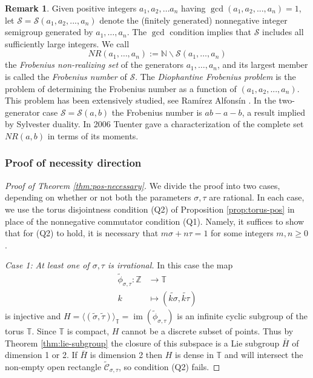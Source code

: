 \documentclass[11pt, letterpaper, reqno]{amsart}
\theoremstyle{definition}
\newtheorem{rmk}[thm]{Remark}
\numberwithin{equation}{section}
\newcommand{\ZZ}{\ensuremath{\mathbb{Z}}}
\newcommand{\NN}{\mathbb{N}}
\newcommand{\TT}{\mathbb{T}}
\newcommand{\cCbar}{\widetilde{\mathcal{C}}}
\newcommand{\sS}{{\mathcal{S}}}
\newcommand{\talpha}{{\sigma}}
\newcommand{\trho}{{\tau}}
\DeclareMathOperator{\im}{im} %
\begin{document}
{%
\begin{rmk}\label{rem:59}
Given positive integers $a_1, a_2, \ldots a_n$ having $\gcd(a_1, a_2, ..., a_n)=1$,
let $\sS= \sS(a_1, a_2, ..., a_n)$ denote the (finitely generated) nonnegative integer semigroup 
generated by  $a_1, \ldots, a_n$.
The $\gcd$ condition implies that $\sS$ includes all sufficiently large integers.
We  call  
$$NR(a_1,\ldots,a_n) :=  \NN \smallsetminus \sS(a_1,\ldots,a_n) $$ 
 the {\em Frobenius non-realizing set} of the  generators $a_1,\ldots,a_n$,
 and its largest member  is called the {\em Frobenius number} of $\sS$. 
 The {\em Diophantine Frobenius problem} is the
 problem of determining the Frobenius number as a function of $(a_1, a_2, ..., a_n)$.
This problem  has been extensively studied,  see Ram\'{i}rez Alfons\'{i}n \cite{RA05}.
In  the two-generator case $\sS= \sS(a, b)$ the Frobenius number is $ab-a-b$,
a result implied by  Sylvester duality. 
 In 2006 Tuenter \cite{Tue06} gave a characterization of the complete set $NR(a, b)$ in
 terms of  its moments.
\end{rmk}
%
\subsubsection{Proof of necessity direction}

\begin{proof}[Proof of Theorem \ref{thm:pos-necessary}]
We divide the proof into two cases, depending on whether or not both the parameters 
$\talpha, \trho$ are  rational.
In each case, 
we use the torus disjointness condition (Q2) of Proposition \ref{prop:torus-pos} 
in place of the nonnegative commutator condition (Q1).
Namely, it suffices to show that for (Q2) to hold,
it is necessary that
$m\talpha + n\trho = 1$ for some integers $m,n\geq 0$.

{\em Case 1:}
{\em At least one of $\talpha, \trho$ is irrational.}
In this case  the map
\begin{align*}
\widetilde{\phi}_{\talpha,\trho} : \ZZ &\to \TT \\
k &\mapsto (\widetilde{k\talpha}, \widetilde{k\trho})
\end{align*}
is injective and 
$H = \langle (\widetilde{\talpha},\widetilde{\trho}) \rangle_{\TT} = \im(\widetilde{\phi}_{\talpha,\trho})$ 
is an infinite cyclic subgroup of the torus $\TT$. 
Since $\TT$ is compact, $H$ cannot be a discrete subset of points.
Thus by Theorem \ref{thm:lie-subgroup} the closure of this subspace is a 
Lie subgroup $\bar{H}$ of dimension 1 or 2. 
If $\bar{H}$ is dimension 2 then $H$ is dense in $\TT$ 
and will intersect the non-empty open rectangle $\cCbar_{\talpha,\trho}$, so condition (Q2) fails.


\end{proof}}
\end{document}
